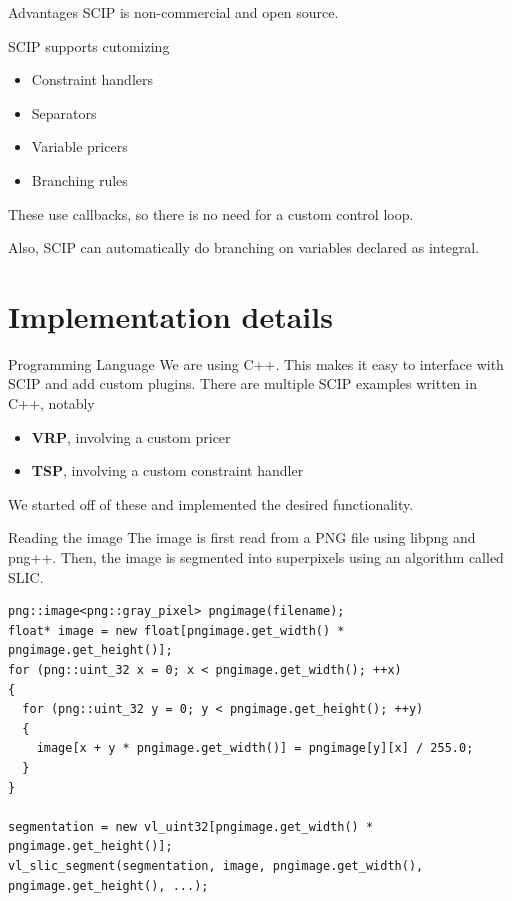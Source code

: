 \documentclass[fleqn]{beamer}
\begin{document}
    \begin{frame}{Advantages}
        SCIP is non-commercial and open source.
    
        SCIP supports cutomizing
        \begin{itemize}
            \item Constraint handlers %
            \item Separators
            \item Variable pricers
            \item Branching rules
        \end{itemize}
        These use callbacks, so there is no need for a custom control loop.
        
        Also, SCIP can automatically do branching on variables declared as integral.
    \end{frame}
	
	\section{Implementation details}
    \begin{frame}{Programming Language}
        We are using C++.
        This makes it easy to interface with SCIP and add custom plugins.
        There are multiple SCIP examples written in C++, notably
        \begin{itemize}
            \item \textbf{VRP}, involving a custom pricer %
            \item \textbf{TSP}, involving a custom constraint handler %
        \end{itemize}
        We started off of these and implemented the desired functionality.
    \end{frame}

\begin{frame}[fragile]{Reading the image}
The image is first read from a PNG file using libpng and png++.
Then, the image is segmented into superpixels using an algorithm called SLIC. %

\begin{verbatim}
png::image<png::gray_pixel> pngimage(filename);
float* image = new float[pngimage.get_width() * pngimage.get_height()];
for (png::uint_32 x = 0; x < pngimage.get_width(); ++x)
{
  for (png::uint_32 y = 0; y < pngimage.get_height(); ++y)
  {
    image[x + y * pngimage.get_width()] = pngimage[y][x] / 255.0;
  }
}

segmentation = new vl_uint32[pngimage.get_width() * pngimage.get_height()];
vl_slic_segment(segmentation, image, pngimage.get_width(), pngimage.get_height(), ...);
\end{verbatim}
\end{frame}
\end{document}
